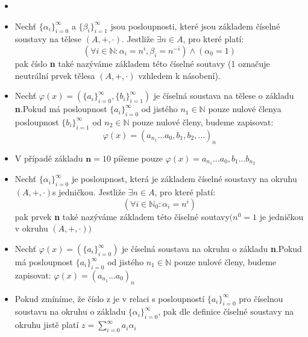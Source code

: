 \documentclass[czech,bachelor,dept470,male]{diploma}
\newcommand{\poslbeta}{\{\beta_i\}_{i=1}^{\infty}}
\newcommand{\poslalpha}{\{\alpha_i\}_{i=0}^{\infty}}
\newcommand{\posla}{\{a_i\}_{i=0}^{\infty}}
\newcommand{\poslb}{\{b_i\}_{i=1}^{\infty}}
\begin{document}
\begin{agreement}\label{u1}
	\begin{itemize}
		\item[]
		\item Nechť $\poslalpha$ a $\poslbeta$ jsou posloupnosti, které jsou základem číselné soustavy na tělese $(A,+,\cdot)$. Jestliže $\exists n \in A$, pro které platí:
		      $$ (\forall i \in \mathbb{N} : \alpha_i = n^i,\beta_i = n^{-i}) \land (\alpha_{0} = 1)$$
		      pak číslo \textbf{n} také nazýváme základem této číselné soutavy (1 označuje neutrální prvek tělesa $(A,+,\cdot)$ vzhledem k násobení).
		\item Nechť $\varphi(x) = (\posla,\poslb)$ je číselná soustava na tělese o základu \textbf{n}.\newline Pokud má posloupnost $\posla$ od jistého $n_1\in\mathbb{N}$ pouze nulové členy\newline a posloupnost $\poslb$ od $n_2\in\mathbb{N}$ pouze nulové členy, budeme zapisovat:
		      $$\varphi(x) = (a_{n_1} \dots a_0,b_1, b_2,\dots)_n$$
		\item V případě základu $\textbf{n}=10$ píšeme pouze $\varphi(x) = a_{n_1} \dots a_0,b_1 \dots b_{n_2}$
		\item Nechť $\poslalpha$ je posloupnost, která je základem číselné soustavy na okruhu $(A,+,\cdot)$\newline s jedničkou. Jestliže $\exists n \in A$, pro které platí:
		      $$(\forall i \in \mathbb{N}_0 : \alpha_i = n^i)$$
		      pak prvek \textbf{n} také nazýváme základem této číselné soutavy\newline $( n^0=1$ je jedničkou v okruhu $(A,+,\cdot) )$
		\item Nechť $\varphi(x) = (\posla)$ je číselná soustava na okruhu o základu \textbf{n}.\newline Pokud má posloupnost $\posla$ od jistého $n_1\in\mathbb{N}$ pouze nulové členy, budeme zapisovat: $\varphi(x) = (a_{n_1} \dots a_0)_n$
		\item Pokud zmíníme, že číslo z je v relaci s posloupností $\posla$ pro číselnou soustavu na okruhu o základu $\{\alpha_i\}_{i=0}^\infty$, pak dle definice číselné soustavy na okruhu jistě platí $z = \sum_{i=0}^{\infty} a_{i}\alpha_{i}$
	\end{itemize}
\end{agreement}
\newpage
\end{document}
